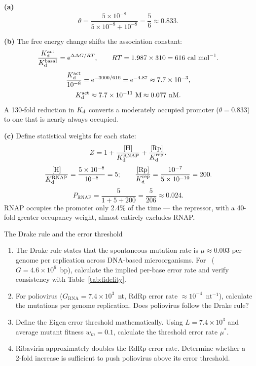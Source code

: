 \documentclass[12pt, a4paper, oneside]{report}
\begin{document}
\begin{solution}
  \textbf{(a)}
  \[
    \theta = \frac{5\times10^{-8}}{5\times10^{-8} + 10^{-8}} = \frac{5}{6} \approx 0.833.
  \]

  \textbf{(b)} The free energy change shifts the association constant:
  \[
    \frac{K_{\mathrm{d}}^\text{act}}{K_{\mathrm{d}}^\text{basal}} = \mathrm{e}^{\Delta\Delta G/RT}, \qquad
    RT = 1.987 \times 310 = 616 \text{ cal mol}^{-1}.
  \]
  \[
    \frac{K_{\mathrm{d}}^\text{act}}{10^{-8}} = \mathrm{e}^{-3000/616} = \mathrm{e}^{-4.87}
    \approx 7.7 \times 10^{-3},
  \]
  \[
    K_{\mathrm{d}}^\text{act} \approx 7.7 \times 10^{-11} \text{ M} \approx 0.077 \text{ nM.}
  \]
  A 130-fold reduction in $K_{\mathrm{d}}$ converts a moderately occupied promoter
  ($\theta = 0.833$) to one that is nearly always occupied.

  \textbf{(c)} Define statistical weights for each state:
  \[
    Z = 1 + \frac{[\mathrm{H}]}{K_{\mathrm{d}}^\text{RNAP}} + \frac{[\mathrm{Rp}]}{K_{\mathrm{d}}^\text{rep}}.
  \]
  \[
    \frac{[\mathrm{H}]}{K_{\mathrm{d}}^\text{RNAP}} = \frac{5\times10^{-8}}{10^{-8}} = 5; \qquad
    \frac{[\mathrm{Rp}]}{K_{\mathrm{d}}^\text{rep}} = \frac{10^{-7}}{5\times10^{-10}} = 200.
  \]
  \[
    P_\text{RNAP} = \frac{5}{1 + 5 + 200} = \frac{5}{206} \approx 0.024.
  \]
  RNAP occupies the promoter only 2.4\% of the time — the repressor,
  with a 40-fold greater occupancy weight, almost entirely excludes RNAP.
\end{solution}

\begin{problem}{\enspace{}\enspace{}\enspace{}\enspace The Drake rule and the error threshold}

  \begin{enumerate}
    \item The Drake rule states that the spontaneous mutation rate is
          $\mu \approx 0.003$ per genome per replication across
          DNA-based microorganisms. For \Ecoli\ ($G = 4.6\times10^6$~bp),
          calculate the implied per-base error rate and verify consistency
          with Table~\ref{tab:fidelity}.
    \item For poliovirus ($G_\text{RNA} = 7.4\times10^3$~nt, RdRp error
          rate $\approx 10^{-4}$~nt$^{-1}$), calculate the mutations per
          genome replication. Does poliovirus follow the Drake rule?
    \item Define the Eigen error threshold mathematically. Using
          $L = 7.4\times10^3$ and average mutant fitness $w_m = 0.1$,
          calculate the threshold error rate $\mu^*$.
    \item Ribavirin approximately doubles the RdRp error rate. Determine
          whether a 2-fold increase is sufficient to push poliovirus
          above its error threshold.
  \end{enumerate}
\end{problem}
\end{document}
